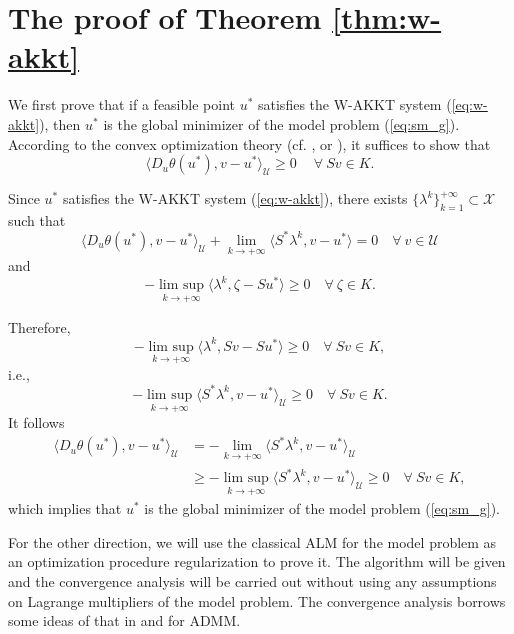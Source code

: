 \documentclass[leqno]{amsart}
\DeclareMathOperator*\uplim{lim\ sup}
\theoremstyle{definition}
\begin{document}
\appendix
\section{The proof of Theorem \ref{thm:w-akkt}}\label{append:A}
We first prove that if a feasible point $u^*$ satisfies the W-AKKT system (\ref{eq:w-akkt}), then $u^*$ is the global minimizer of the model problem (\ref{eq:sm_g}). According to the convex optimization theory (cf. \cite[Proposition 26.5]{bauschke2011convex}, \cite[Proposition 2.1, Chapter II]{ekeland1999convex} or \cite[Corollary 4.20]{jahn2020introduction}), it suffices to show that 
$$ \langle D_u\theta(u^*), v - u^*\rangle_\mathcal{U} \geq 0\quad\ \forall\ Sv\in K.$$

Since $u^*$ satisfies the W-AKKT system (\ref{eq:w-akkt}), there exists $\{\lambda^k\}_{k=1}^{+\infty}\subset \mathcal{X}$ such that 
$$\langle D_u\theta(u^*), v - u^*\rangle_\mathcal{U} + \lim\limits_{k\rightarrow+\infty}\langle S^*\lambda^k, v - u^*\rangle = 0\quad \forall\ v\in\mathcal{U} $$
and
$$ -\uplim\limits_{k\rightarrow+\infty}\langle \lambda^k, \zeta - Su^*\rangle \geq 0\quad \forall\ \zeta\in K.$$
 
Therefore,
$$ -\uplim\limits_{k\rightarrow+\infty}\langle \lambda^k, Sv - Su^*\rangle \geq 0\quad \forall\ Sv \in K,$$
i.e.,
$$ -\uplim\limits_{k\rightarrow+\infty}\langle S^*\lambda^k, v - u^*\rangle_{\mathcal{U}} \geq 0\quad \forall\ Sv \in K.$$
It follows
\begin{equation}\label{eq:thm_if}
\begin{aligned}
\langle D_u\theta(u^*), v - u^*\rangle_\mathcal{U} 
&= - \lim\limits_{k\rightarrow+\infty}\langle S^*\lambda^k, v - u^*\rangle_{\mathcal{U}}\\
& \geq -\uplim\limits_{k\rightarrow+\infty}\langle S^*\lambda^k, v - u^*\rangle_{\mathcal{U}}  \geq 0\quad \forall\ Sv \in K,
\end{aligned}
\end{equation}
which implies that $u^*$ is the global minimizer of the model problem (\ref{eq:sm_g}).

For the other direction, we will use the classical ALM for the model problem as an optimization procedure regularization to prove it. The algorithm will be given and the convergence analysis will be carried out without using any assumptions on Lagrange multipliers of the model problem. The convergence analysis borrows some ideas of that in  \cite{glowinski2020admm} and \cite{jiao2016alternating}  for ADMM. 
\end{document}
